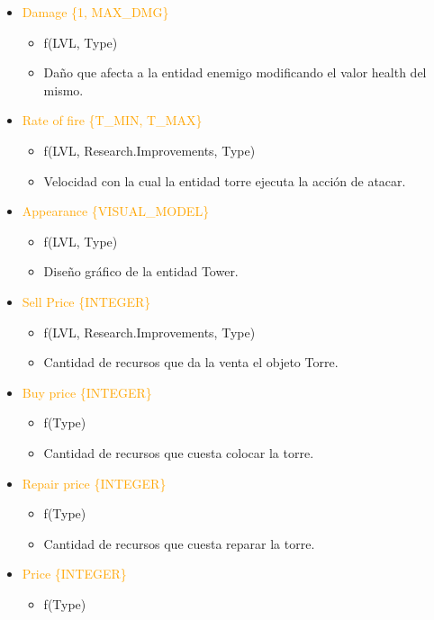 \documentclass{article}
\begin{document}
\begin{itemize}
    \item \textcolor{Orange}{Damage \{1, MAX\_DMG\}}
    \begin{itemize}
        \item f(LVL, Type)
        \item Daño que afecta a la entidad enemigo modificando el valor health del mismo.
    \end{itemize}
    \item \textcolor{Orange}{Rate of fire \{T\_MIN, T\_MAX\}}
    \begin{itemize}
        \item f(LVL, Research.Improvements, Type)
        \item Velocidad con la cual la entidad torre ejecuta la acción de atacar.
    \end{itemize}
    \item \textcolor{Orange}{Appearance \{VISUAL\_MODEL\}}
    \begin{itemize}
        \item f(LVL, Type)
        \item Diseño gráfico de la entidad Tower.
    \end{itemize}
    \hfill \break
    \item \textcolor{Orange}{Sell Price \{INTEGER\}}
    \begin{itemize}
        \item f(LVL, Research.Improvements, Type)
        \item Cantidad de recursos que da la venta el objeto Torre.
    \end{itemize}
    \item \textcolor{Orange}{Buy price \{INTEGER\}}
    \begin{itemize}
        \item f(Type)
        \item Cantidad de recursos que cuesta colocar la torre.
    \end{itemize}
    \item \textcolor{Orange}{Repair price \{INTEGER\}}
    \begin{itemize}
        \item f(Type)
        \item Cantidad de recursos que cuesta reparar la torre.
    \end{itemize}
    \item \textcolor{Orange}{Price \{INTEGER\}}
    \begin{itemize}
        \item f(Type)

\end{itemize}
\end{itemize}
\end{document}
